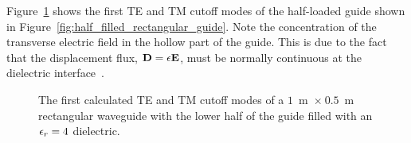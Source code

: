Figure~\ref{fig:half_filled_rectangular_cutoff_modes} shows the first
TE and TM cutoff modes of the half-loaded guide shown in
Figure~\ref{fig:half_filled_rectangular_guide}. Note the concentration
of the transverse electric field in the hollow part of the guide. This
is due to the fact that the displacement flux, $\mathbf{D} =
\epsilon\mathbf{E}$, must be normally continuous at the dielectric
interface~\cite{Poz2005, Smi1997}.
\begin{figure}[h]
\centering
\caption{The first calculated TE and TM cutoff modes of a $1$~m~$\times~0.5$~m rectangular waveguide with the lower half of the guide filled with an $\epsilon_r = 4$ dielectric.}
\label{fig:half_filled_rectangular_cutoff_modes}
\end{figure}

